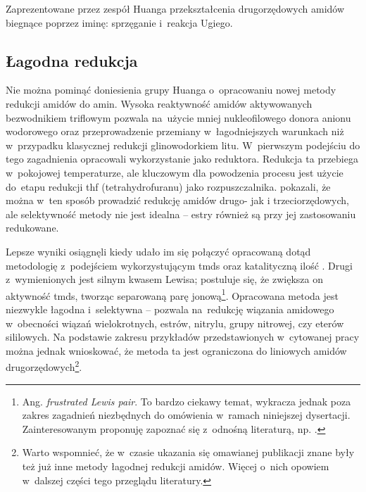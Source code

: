 \begin{scheme*}
  \centering
  
  \caption{
    Zaprezentowane przez zespół Huanga przekształcenia drugorzędowych amidów biegnące poprzez iminę: sprzęganie i~reakcja Ugiego.
  }
  \label{sch:huang-ugi-diamine}
\end{scheme*}


\subsection{Łagodna redukcja}
Nie można pominąć doniesienia grupy Huanga o~opracowaniu nowej metody redukcji amidów do amin.
Wysoka reaktywność amidów aktywowanych bezwodnikiem triflowym pozwala na~użycie mniej nukleofilowego donora anionu wodorowego oraz
przeprowadzenie przemiany w~łagodniejszych warunkach niż w~przypadku klasycznej redukcji glinowodorkiem litu.
W~pierwszym podejściu do tego zagadnienia opracowali wykorzystanie  jako reduktora.
Redukcja ta przebiega w~pokojowej temperaturze, ale
  kluczowym dla powodzenia procesu jest użycie do~etapu redukcji \acrshort{thf} (tetrahydrofuranu) jako rozpuszczalnika.
\citeauthor{xiang10} pokazali, że można w~ten sposób prowadzić redukcję amidów drugo- jak i trzeciorzędowych,
  ale selektywność metody nie jest idealna \--- estry również są przy jej zastosowaniu redukowane\autocite{xiang10}.

Lepsze wyniki osiągnęli \citeauthor{huang16b} kiedy udało im się połączyć\autocite{huang16b} opracowaną dotąd metodologię 
  z~podejściem wykorzystującym \gls{tmds} oraz katalityczną ilość \autocite{tan09, chadwick14, blondiaux14}.
Drugi z~wymienionych jest silnym kwasem Lewisa; postuluje się, że zwiększa on aktywność \gls{tmds},
  tworząc separowaną parę jonową\footnote{%
    Ang. \emph{frustrated Lewis pair}. To bardzo ciekawy temat,
    wykracza jednak poza zakres zagadnień niezbędnych do omówienia w~ramach niniejszej dysertacji.
    Zainteresowanym proponuję zapoznać się z~odnośną literaturą, np. \cite{stephan15}.%
  }.
Opracowana metoda jest niezwykle łagodna i~selektywna \--- pozwala na~redukcję wiązania amidowego
  w~obecności wiązań wielokrotnych, estrów, nitrylu, grupy nitrowej, czy eterów sililowych.
Na podstawie zakresu przykładów przedstawionych w~cytowanej pracy można jednak wnioskować,
  że metoda ta jest ograniczona do liniowych amidów drugorzędowych\footnote{%
    Warto wspomnieć, że w~czasie ukazania się omawianej publikacji znane były też już inne metody łagodnej redukcji amidów.
    Więcej o~nich opowiem w~dalszej części tego przeglądu literatury.
  }.

